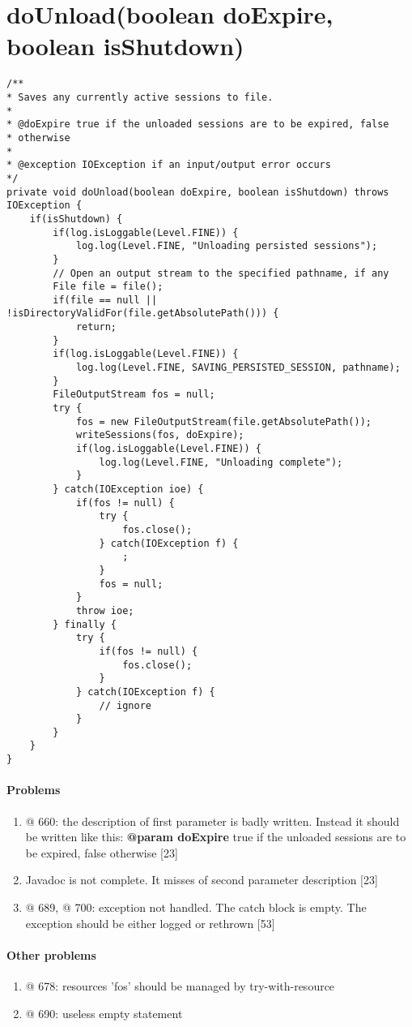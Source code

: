 \section*{doUnload(boolean doExpire, boolean isShutdown)}
\lstset{firstnumber=657}
\begin{lstlisting}
/**
* Saves any currently active sessions to file.
*
* @doExpire true if the unloaded sessions are to be expired, false
* otherwise
*
* @exception IOException if an input/output error occurs
*/
private void doUnload(boolean doExpire, boolean isShutdown) throws IOException {
	if(isShutdown) {
		if(log.isLoggable(Level.FINE)) {
			log.log(Level.FINE, "Unloading persisted sessions");
		}
		// Open an output stream to the specified pathname, if any
		File file = file();
		if(file == null || !isDirectoryValidFor(file.getAbsolutePath())) {
			return;
		}
		if(log.isLoggable(Level.FINE)) {
			log.log(Level.FINE, SAVING_PERSISTED_SESSION, pathname);
		}
		FileOutputStream fos = null;
		try {
			fos = new FileOutputStream(file.getAbsolutePath());
			writeSessions(fos, doExpire);
			if(log.isLoggable(Level.FINE)) {
				log.log(Level.FINE, "Unloading complete");
			}
		} catch(IOException ioe) {
			if(fos != null) {
				try {
					fos.close();
				} catch(IOException f) {
					;
				}
				fos = null;
			}
			throw ioe;
		} finally {
			try {
				if(fos != null) {
					fos.close();
				}
			} catch(IOException f) {
				// ignore
			}
		}
	}
}
\end{lstlisting}
\paragraph{Problems}
\begin{enumerate}
	\item @ 660: the description of first parameter is badly written. Instead it should be written like this: \textbf{@param doExpire} true if the unloaded sessions are to be expired, false otherwise [23]
	\item Javadoc is not complete. It misses of second parameter description [23]
	\item @ 689, @ 700: exception not handled. The catch block is empty. The exception should be either logged or rethrown [53]
\end{enumerate}

\paragraph{Other problems}
\begin{enumerate}
	\item @ 678: resources 'fos' should be managed by try-with-resource
	\item @ 690: useless empty statement	
\end{enumerate}

